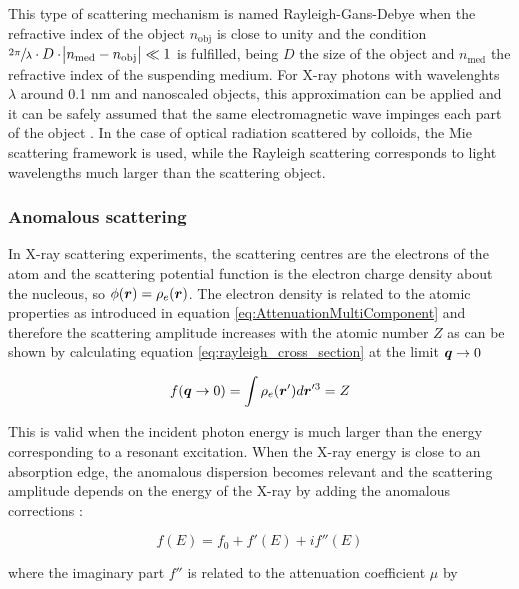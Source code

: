 This type of scattering mechanism is named Rayleigh-Gans-Debye when the refractive index of the object $n_{\text{obj}}$ is close to unity and the condition $\sfrac{2\pi}{\lambda} \cdot D \cdot  \abs{n_{\text{med}} - n_{\text{obj}}} \ll 1$ is fulfilled, being $D$ the size of the object and $n_{\text{med}}$ the refractive index of the suspending medium. For X-ray photons with wavelenghts $\lambda$ around 0.1 nm and nanoscaled objects, this approximation can be applied and it can be safely assumed that the same electromagnetic wave impinges each part of the object \citep{hulst_light_1957, barber_rayleigh-gans-debye_1978}. In the case of optical radiation scattered by colloids, the Mie scattering framework is used, while the Rayleigh scattering corresponds to light wavelengths much larger than the scattering object.

\subsubsection{Anomalous scattering}

In X-ray scattering experiments, the scattering centres are the electrons of the atom and the scattering potential function is the electron charge density about the nucleous, so $\phi(\bm{r})=\rho_e(\bm{r})$. The electron density is related to the atomic properties as introduced in equation \ref{eq:AttenuationMultiComponent} and therefore the scattering amplitude increases with the atomic number $Z$ as can be shown by calculating equation \ref{eq:rayleigh_cross_section} at the limit $\bm{q} \rightarrow 0$

\begin{equation}
        f(\bm{q} \rightarrow 0) = \int \rho_e(\bm{r}')  d\bm{r}'^3 = Z
\end{equation}

This is valid when the incident photon energy is much larger than the energy corresponding to a resonant excitation. When the X-ray energy is close to an absorption edge, the anomalous dispersion becomes relevant and the scattering amplitude depends on the energy of the X-ray by adding the anomalous corrections \citep{als-nielsen_elements_2011}:

\begin{equation}
        f(E) = f_0 + f'(E) + i f'' (E)
\end{equation}

where the imaginary part $f''$ is related to the attenuation coefficient $\mu$ by \citep{feigin_structure_1987}

